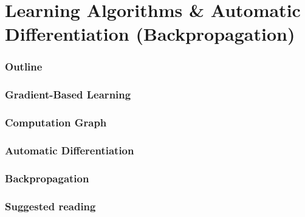 \renewcommand{\thispart}{4 }
\renewcommand{\thispartname}{
   Learning Algorithms \& 
   Automatic Differentiation (Backpropagation)}

\part{\thispartname}



\section{Outline}


% 
\section{Gradient-Based Learning}

\section{Computation Graph}



\section{Automatic Differentiation}







\section{Backpropagation}

\section{Suggested reading}

